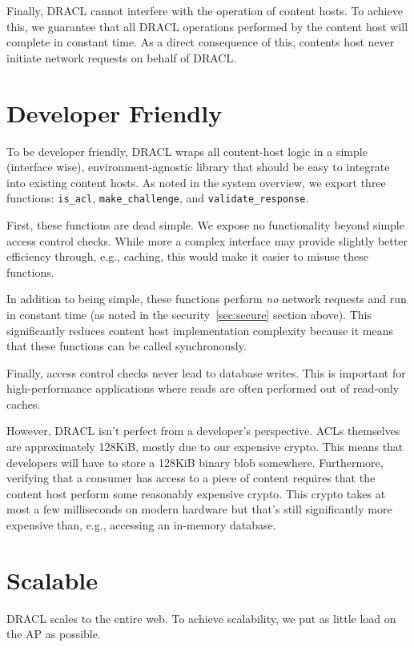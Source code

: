 \documentclass[pdftex,12pt,a4papaer,twoside,notitlepage]{report}
\begin{document}
Finally, DRACL cannot interfere with the operation of content hosts. To achieve
this, we guarantee that all DRACL operations performed by the content host will
complete in constant time. As a direct consequence of this, contents host never
initiate network requests on behalf of DRACL\@.

\section{Developer Friendly}

To be developer friendly, DRACL wraps all content-host logic in a simple
(interface wise), environment-agnostic library that should be easy to integrate
into existing content hosts. As noted in the system overview, we export three
functions: \verb=is_acl=, \verb=make_challenge=, and \verb=validate_response=.

First, these functions are dead simple. We expose no functionality beyond simple
access control checks. While more a complex interface may provide slightly better
efficiency through, e.g., caching, this would make it easier to misuse these
functions.

In addition to being simple, these functions perform \emph{no} network requests
and run in constant time (as noted in the security~\cref{sec:secure} section
above). This significantly reduces content host implementation complexity
because it means that these functions can be called synchronously.

Finally, access control checks never lead to database writes. This is important
for high-performance applications where reads are often performed out of
read-only caches.

However, DRACL isn't perfect from a developer's perspective. ACLs themselves are
approximately 128KiB, mostly due to our expensive crypto. This means that
developers will have to store a 128KiB binary blob somewhere. Furthermore,
verifying that a consumer has access to a piece of content requires that the
content host perform some reasonably expensive crypto. This crypto takes at most
a few milliseconds on modern hardware but that's still significantly more
expensive than, e.g., accessing an in-memory database.

\section{Scalable}

DRACL scales to the entire web. To achieve scalability, we put as little load on
the AP as possible.
\end{document}
